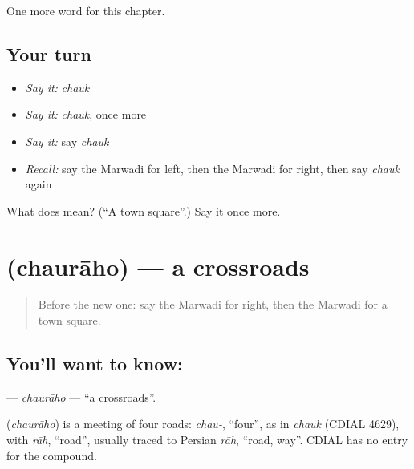 \begin{grammarlens}[title={What you've built}]
One more word for this chapter.
\end{grammarlens}

\subsection*{Your turn}
\begin{itemize}
\raggedright
  \item \emph{Say it:} \emph{chauk}
  \item \emph{Say it:} \emph{chauk}, once more
  \item \emph{Say it:} say \emph{chauk}
  \item \emph{Recall:} say the Marwadi for left, then the Marwadi for right, then say \emph{chauk} again
\end{itemize}

\begin{tcolorbox}[breakable,colback=teal!4,colframe=teal!35!black,title={Before you move on}]
What does  mean? (\textquotedblleft{}A town square\textquotedblright{}.) Say it once more.
\end{tcolorbox}
\section[\texorpdfstring{\mw{चौराहो} (chaurāho)}{चौराहो (chaurāho)}]{ (chaurāho) — a crossroads}

\label{lesson:MW-C98-chauraho}



\begin{quote}
Before the new one: say the Marwadi for right, then the Marwadi for a town square.
\end{quote}

\subsection*{You'll want to know: }
\textbf{} — \emph{chaurāho} — \textquotedblleft{}a crossroads\textquotedblright{}.

\begin{cousinweb}
\textbf{} (\emph{chaurāho}) is a meeting of four roads: \emph{chau-}, \textquotedblleft{}four\textquotedblright{}, as in \emph{chauk} (CDIAL 4629), with \emph{rāh}, \textquotedblleft{}road\textquotedblright{}, usually traced to Persian \emph{rāh}, \textquotedblleft{}road, way\textquotedblright{}. CDIAL has no entry for the compound.
\end{cousinweb}

